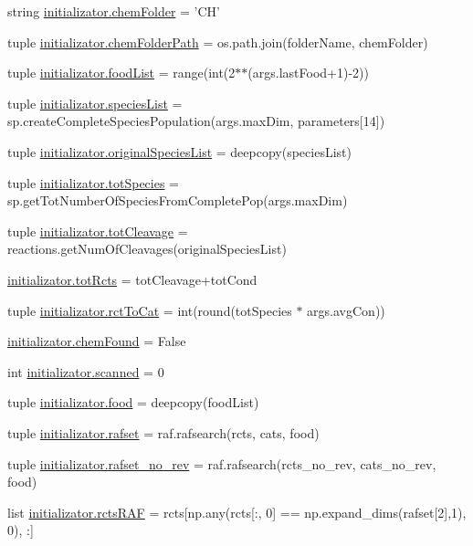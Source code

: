 \begin{DoxyCompactItemize}
\item 
string \hyperlink{a00135_a4a57e1e8a830824b985f34ee1af52b93}{initializator.\-chem\-Folder} = 'C\-H'
\item 
tuple \hyperlink{a00135_a633d7089af5a033807ccba3b7e9ad483}{initializator.\-chem\-Folder\-Path} = os.\-path.\-join(folder\-Name, chem\-Folder)
\item 
tuple \hyperlink{a00135_a402edf66e27aa29932e16311c9756b02}{initializator.\-food\-List} = range(int(2$\ast$$\ast$(args.\-last\-Food+1)-\/2))
\item 
tuple \hyperlink{a00135_a79af2b1d3fe38f2cd259cc56b1ecc5f3}{initializator.\-species\-List} = sp.\-create\-Complete\-Species\-Population(args.\-max\-Dim, parameters\mbox{[}14\mbox{]})
\item 
tuple \hyperlink{a00135_ab4024b0cf8a4136e81ae636c9cf6e0e4}{initializator.\-original\-Species\-List} = deepcopy(species\-List)
\item 
tuple \hyperlink{a00135_a7f8e1635318ca1aac728dd7165aa49b5}{initializator.\-tot\-Species} = sp.\-get\-Tot\-Number\-Of\-Species\-From\-Complete\-Pop(args.\-max\-Dim)
\item 
tuple \hyperlink{a00135_a517da3913f56e5216fa2c68818e04ecc}{initializator.\-tot\-Cleavage} = reactions.\-get\-Num\-Of\-Cleavages(original\-Species\-List)
\item 
\hyperlink{a00135_a1c0855f92c2dd2dd4a30f6624f6e1af0}{initializator.\-tot\-Rcts} = tot\-Cleavage+tot\-Cond
\item 
tuple \hyperlink{a00135_afee9c574290c862d3ad8a51a77b2a72e}{initializator.\-rct\-To\-Cat} = int(round(tot\-Species $\ast$ args.\-avg\-Con))
\item 
\hyperlink{a00135_acdd521d6bd1a71be37421dafd210de99}{initializator.\-chem\-Found} = False
\item 
int \hyperlink{a00135_afafc4f533cad86cb7fd1b6fe5ed9effa}{initializator.\-scanned} = 0
\item 
tuple \hyperlink{a00135_a4fe31b6cfa3dcaa4141be9282566fa7a}{initializator.\-food} = deepcopy(food\-List)
\item 
tuple \hyperlink{a00135_a1d1d6b79a11a2c646cdccd86ed33c06e}{initializator.\-rafset} = raf.\-rafsearch(rcts, cats, food)
\item 
tuple \hyperlink{a00135_a233edb9c8bdc6d737256db839206b8eb}{initializator.\-rafset\-\_\-no\-\_\-rev} = raf.\-rafsearch(rcts\-\_\-no\-\_\-rev, cats\-\_\-no\-\_\-rev, food)
\item 
list \hyperlink{a00135_af3ff3d6a780c5a5522cef529ea028654}{initializator.\-rcts\-R\-A\-F} = rcts\mbox{[}np.\-any(rcts\mbox{[}\-:, 0\mbox{]} == np.\-expand\-\_\-dims(rafset\mbox{[}2\mbox{]},1), 0), \-:\mbox{]}
$$
\end{DoxyCompactItemize}
